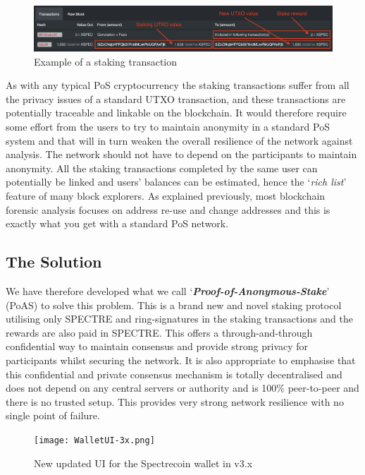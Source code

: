 \begin{figure}[h]
    \centering
    \includegraphics[width=\textwidth]{Images/txnexample.png}
    \caption{Example of a staking transaction}
    \label{fig}
\end{figure}


\noindent
As with any typical PoS cryptocurrency the staking transactions suffer
from all the privacy issues of a standard UTXO transaction, and these
transactions are potentially traceable and linkable on the blockchain.
It would therefore require some effort from the users to try to maintain
anonymity in a standard PoS system and that will in turn weaken the overall
resilience of the network against analysis. The network should not have to
depend on the participants to maintain anonymity. All the staking
transactions completed by the same user can potentially be linked and users’
balances can be estimated, hence the ‘\textit{rich list}’ feature of many
block explorers. As explained previously, most blockchain forensic analysis
focuses on address re-use and change addresses and this is exactly what you
get with a standard PoS network.



\subsection{The Solution}
We have therefore developed what we call ‘\textbf{\textit{Proof-of-Anonymous-Stake}}’
(PoAS) to solve this problem. This is a brand new and novel staking protocol
utilising only SPECTRE and ring-signatures in the staking transactions and
the rewards are also paid in SPECTRE. This offers a through-and-through
confidential way to maintain consensus and provide strong privacy for
participants whilst securing the network. It is also appropriate to emphasise
that this confidential and private consensus mechanism is totally
decentralised and does not depend on any central servers or authority and is
100\% peer-to-peer and there is no trusted setup. This provides very strong
network resilience with no single point of failure.

\begin{figure}[h]
	\centering
	\texttt{[image: WalletUI-3x.png]}
	\caption{New updated UI for the Spectrecoin wallet in v3.x}
\end{figure}



